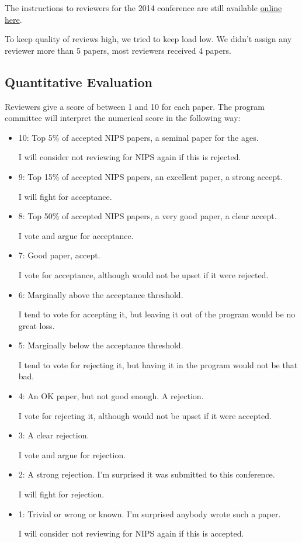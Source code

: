 \begin{flushright}
\end{flushright}

The instructions to reviewers for the 2014 conference are still
available
\href{https://nips.cc/Conferences/2014/PaperInformation/ReviewerInstructions}{online
here}.

To keep quality of reviews high, we tried to keep load low. We didn't
assign any reviewer more than 5 papers, most reviewers received 4
papers.

\hypertarget{quantitative-evaluation}{%
\subsection{Quantitative Evaluation}\label{quantitative-evaluation}}

Reviewers give a score of between 1 and 10 for each paper. The program
committee will interpret the numerical score in the following way:

\begin{itemize}
\item
  10: Top 5\% of accepted NIPS papers, a seminal paper for the ages.

  I will consider not reviewing for NIPS again if this is rejected.
\item
  9: Top 15\% of accepted NIPS papers, an excellent paper, a strong
  accept.

  I will fight for acceptance.
\item
  8: Top 50\% of accepted NIPS papers, a very good paper, a clear
  accept.

  I vote and argue for acceptance.
\item
  7: Good paper, accept.

  I vote for acceptance, although would not be upset if it were
  rejected.
\item
  6: Marginally above the acceptance threshold.

  I tend to vote for accepting it, but leaving it out of the program
  would be no great loss.
\item
  5: Marginally below the acceptance threshold.

  I tend to vote for rejecting it, but having it in the program would
  not be that bad.
\item
  4: An OK paper, but not good enough. A rejection.

  I vote for rejecting it, although would not be upset if it were
  accepted.
\item
  3: A clear rejection.

  I vote and argue for rejection.
\item
  2: A strong rejection. I'm surprised it was submitted to this
  conference.

  I will fight for rejection.
\item
  1: Trivial or wrong or known. I'm surprised anybody wrote such a
  paper.

  I will consider not reviewing for NIPS again if this is accepted.
\end{itemize}

